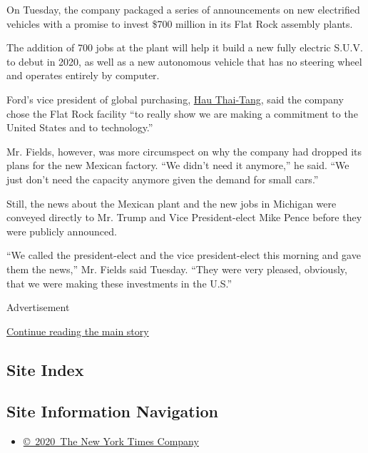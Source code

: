On Tuesday, the company packaged a series of announcements on new
electrified vehicles with a promise to invest \$700 million in its Flat
Rock assembly plants.

The addition of 700 jobs at the plant will help it build a new fully
electric S.U.V. to debut in 2020, as well as a new autonomous vehicle
that has no steering wheel and operates entirely by computer.

Ford's vice president of global purchasing,
\href{https://media.ford.com/content/fordmedia/fna/us/en/people/hau-thai-tang.html}{Hau
Thai-Tang}, said the company chose the Flat Rock facility ``to really
show we are making a commitment to the United States and to
technology.''

Mr. Fields, however, was more circumspect on why the company had dropped
its plans for the new Mexican factory. ``We didn't need it anymore,'' he
said. ``We just don't need the capacity anymore given the demand for
small cars.''

Still, the news about the Mexican plant and the new jobs in Michigan
were conveyed directly to Mr. Trump and Vice President-elect Mike Pence
before they were publicly announced.

``We called the president-elect and the vice president-elect this
morning and gave them the news,'' Mr. Fields said Tuesday. ``They were
very pleased, obviously, that we were making these investments in the
U.S.''

Advertisement

\protect\hyperlink{after-bottom}{Continue reading the main story}

\hypertarget{site-index}{%
\subsection{Site Index}\label{site-index}}

\hypertarget{site-information-navigation}{%
\subsection{Site Information
Navigation}\label{site-information-navigation}}

\begin{itemize}
\tightlist
\item
  \href{https://help.nytimes3xbfgragh.onion/hc/en-us/articles/115014792127-Copyright-notice}{©~2020~The
  New York Times Company}
\end{itemize}

